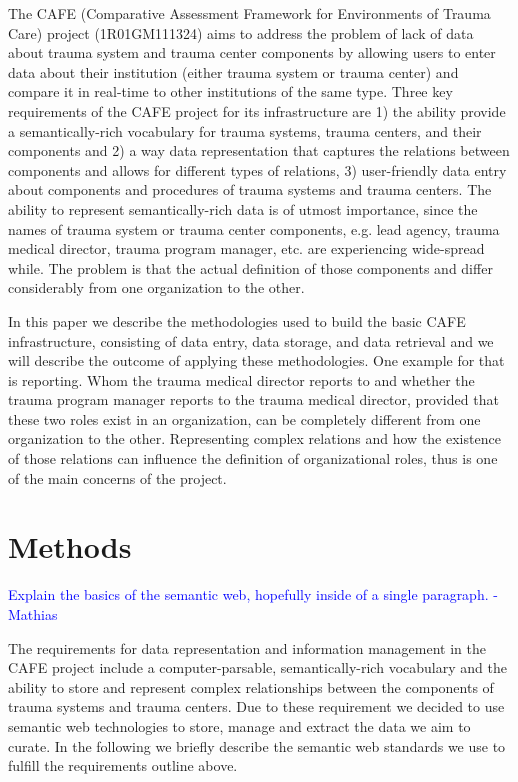 \documentclass{amia}
\begin{document}
The CAFE (Comparative Assessment Framework for Environments of Trauma Care) project (1R01GM111324) aims to address the problem of lack of data about trauma system and trauma center components by allowing users to enter data about their institution (either trauma system or trauma center) and compare it in real-time to other institutions of the same type. Three key requirements of the CAFE project for its infrastructure are 1) the ability provide a semantically-rich vocabulary for trauma systems, trauma centers, and their components and 2) a way data representation that captures the relations between components and allows for different types of relations, 3) user-friendly data entry about components and procedures of trauma systems and trauma centers. The ability to represent semantically-rich data is of utmost importance, since the names of trauma system or trauma center components, e.g. lead agency, trauma medical director, trauma program manager, etc. are experiencing wide-spread while. The problem is that the actual definition of those components and differ considerably from one organization to the other.

In this paper we describe the methodologies used to build the basic CAFE infrastructure, consisting of data entry, data storage, and data retrieval and we will describe the outcome of applying these methodologies. One example for that is reporting. Whom the trauma medical director reports to and whether the trauma program manager reports to the trauma medical director, provided that these two roles exist in an organization, can be completely different from one organization to the other. Representing complex relations and how the existence of those relations can influence the definition of organizational roles, thus is one of the main concerns of the project.



\section*{Methods}
\textcolor{blue}{Explain the basics of the semantic web, hopefully inside of a single paragraph. - Mathias}

The requirements for data representation and information management in the CAFE project include a computer-parsable, semantically-rich vocabulary and the ability to store and represent complex relationships between the components of trauma systems and trauma centers. Due to these requirement we decided to use semantic web technologies to store, manage and extract the data we aim to curate. In the following we briefly describe the semantic web standards we use to fulfill the requirements outline above.
\end{document}
